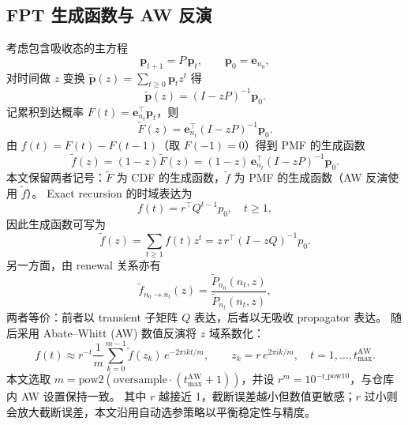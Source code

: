 \documentclass[11pt,fontset=fandol]{ctexart}
\begin{document}
\subsection{FPT 生成函数与 AW 反演}
考虑包含吸收态的主方程
\begin{equation}
  \mathbf{p}_{t+1}=P\,\mathbf{p}_t,\qquad \mathbf{p}_0=\mathbf{e}_{n_0},
\end{equation}
对时间做 $z$ 变换 $\tilde{\mathbf{p}}(z)=\sum_{t\ge 0}\mathbf{p}_t z^t$ 得
\begin{equation}
  \tilde{\mathbf{p}}(z)=(I-zP)^{-1}\mathbf{p}_0.
\end{equation}
记累积到达概率 $F(t)=\mathbf{e}_{n_t}^\top \mathbf{p}_t$，则
\begin{equation}
  \tilde F(z)=\mathbf{e}_{n_t}^\top (I-zP)^{-1}\mathbf{p}_0.
\end{equation}
由 $f(t)=F(t)-F(t-1)$（取 $F(-1)=0$）得到 PMF 的生成函数
\begin{equation}
  \tilde f(z)=(1-z)\tilde F(z)=(1-z)\,\mathbf{e}_{n_t}^\top (I-zP)^{-1}\mathbf{p}_0.
\end{equation}
本文保留两者记号：$\tilde F$ 为 CDF 的生成函数，$\tilde f$ 为 PMF 的生成函数（AW 反演使用 $\tilde f$）。
Exact recursion 的时域表达为
\begin{equation}
  f(t)=r^\top Q^{t-1} p_0,\quad t\ge 1,
  \label{eq:exact-recursion}
\end{equation}
因此生成函数可写为
\begin{equation}
  \tilde f(z)=\sum_{t\ge 1} f(t) z^t
  = z\,r^\top (I-zQ)^{-1} p_0.
\end{equation}
另一方面，由 renewal 关系亦有
\begin{equation}
  \tilde f_{n_0\to n_t}(z)=\frac{\tilde P_{n_0}(n_t,z)}{\tilde P_{n_t}(n_t,z)},
  \label{eq:Fz}
\end{equation}
两者等价：前者以 transient 子矩阵 $Q$ 表达，后者以无吸收 propagator 表达。
随后采用 Abate--Whitt (AW) 数值反演将 $z$ 域系数化：
\begin{equation}
  f(t)\approx r^{-t}\frac{1}{m}\sum_{k=0}^{m-1}\tilde f(z_k)\,e^{-2\pi i k t/m},
  \qquad z_k=r\,e^{2\pi i k/m},\quad t=1,\dots,t_{\max}^{\mathrm{AW}}.
  \label{eq:AW}
\end{equation}
本文选取 $m=\mathrm{pow2}(\text{oversample}\cdot(t_{\max}^{\mathrm{AW}}+1))$，并设 $r^m=10^{-\text{r\_pow10}}$，与仓库内 AW 设置保持一致。
其中 $r$ 越接近 1，截断误差越小但数值更敏感；$r$ 过小则会放大截断误差，本文沿用自动选参策略以平衡稳定性与精度。
\end{document}
